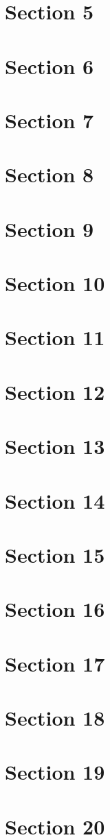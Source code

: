 \documentclass{article}
\begin{document}
\section{Section 5}
\section{Section 6}
\section{Section 7}
\section{Section 8}
\section{Section 9}
\section{Section 10}
\section{Section 11}
\section{Section 12}
\section{Section 13}
\section{Section 14}
\section{Section 15}
\section{Section 16}
\section{Section 17}
\section{Section 18}
\section{Section 19}
\section{Section 20}
\end{document}
